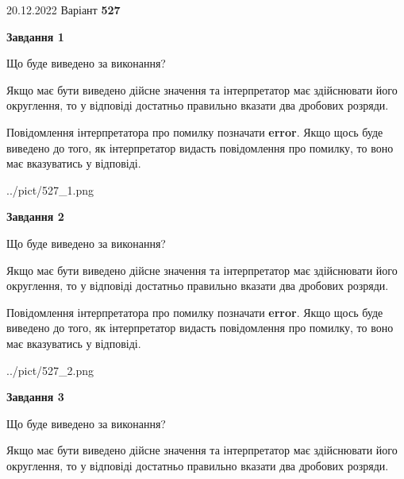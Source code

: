 \documentclass[12pt, ukrainian]{article}
\begin{document}
{20.12.2022 Варіант \No \textbf { 527 }\par}
{
\begin {Large}

{\begin {center}\textbf{Завдання 1}\end {center}}\par
Що буде виведено за виконання? \par

Якщо має бути виведено дійсне значення та інтерпретатор має здійснювати його округлення, 
то у відповіді достатньо правильно вказати два дробових розряди.

Повідомлення інтерпретатора про помилку позначати \textbf{error}.
Якщо щось буде виведено до того, як інтерпретатор видасть повідомлення про помилку, 
то воно має вказуватись у відповіді. \par

\begin{center}
	{../pict/527_1.png}
\end{center}
\newpage

{\begin {center}\textbf{Завдання 2}\end {center}}\par
Що буде виведено за виконання? \par

Якщо має бути виведено дійсне значення та інтерпретатор має здійснювати його округлення, 
то у відповіді достатньо правильно вказати два дробових розряди.

Повідомлення інтерпретатора про помилку позначати \textbf{error}.
Якщо щось буде виведено до того, як інтерпретатор видасть повідомлення про помилку, 
то воно має вказуватись у відповіді. \par

\begin{center}
	{../pict/527_2.png}
\end{center}
\newpage

{\begin {center}\textbf{Завдання 3}\end {center}}\par
Що буде виведено за виконання? \par

Якщо має бути виведено дійсне значення та інтерпретатор має здійснювати його округлення, 
то у відповіді достатньо правильно вказати два дробових розряди.


\end{Large}}
\end{document}

